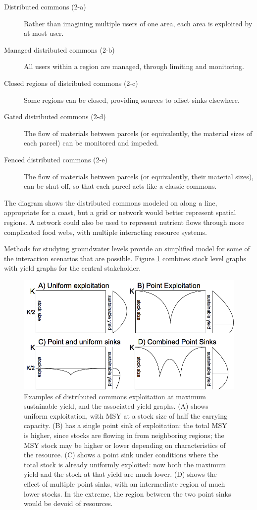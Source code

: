 \documentclass[12pt, oneside]{amsart}
\begin{document}
\begin{description}
  \item[Distributed commons (2-a)]
    Rather than imagining multiple users of one area, each area is exploited by at most user.
  \item[Managed distributed commons (2-b)]
    All users within a region are managed, through limiting and monitoring.
  \item[Closed regions of distributed commons (2-c)]
    Some regions can be closed, providing sources to offset sinks elsewhere.
  \item[Gated distributed commons (2-d)]
    The flow of materials between parcels (or equivalently, the material sizes of each parcel) can be monitored and impeded.
  \item[Fenced distributed commons (2-e)]
    The flow of materials between parcels (or equivalently, their material sizes), can be shut off, so that each parcel acts like a classic commons.
\end{description}

The diagram shows the distributed commons modeled on along a line, appropriate for a coast, but a grid or network would better represent spatial regions.  A network could also be used to represent nutrient flows through more complicated food webs, with multiple interacting resource systems.

Methods for studying groundwater levels provide an simplified model for some of the interaction scenarios that are possible.  Figure \ref{fig:capacity} combines stock level graphs with yield graphs for the central stakeholder.

\begin{figure}[htp]
  \includegraphics[width=6.5in]{capacity.png}
  \caption{Examples of distributed commons exploitation at maximum sustainable yield, and the associated yield graphs.  (A) shows uniform exploitation, with MSY at a stock size of half the carrying capacity.  (B) has a single point sink of exploitation: the total MSY is higher, since stocks are flowing in from neighboring regions; the MSY stock may be higher or lower depending on characteristics of the resource.  (C) shows a point sink under conditions where the total stock is already uniformly exploited: now both the maximum yield and the stock at that yield are much lower.  (D) shows the effect of multiple point sinks, with an intermediate region of much lower stocks.  In the extreme, the region between the two point sinks would be devoid of resources.}
  \label{fig:capacity}
\end{figure}
\end{document}
